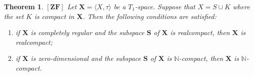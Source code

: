 \documentclass[12pt,twoside,leqno]{article}
\theoremstyle{plain}
\newtheorem{theorem}{Theorem}[section]
\theoremstyle{definition}
\theoremstyle{remark}
\begin{document}
\begin{theorem}
	\label{s6:t18}
	$[\mathbf{ZF}]$ Let $\mathbf{X}=\langle X, \tau\rangle$ be a $T_1$-space. Suppose that $X=S\cup K$ where the set $K$ is compact in $\mathbf{X}$. Then the following conditions are satisfied:
	\begin{enumerate}
		\item[(i)] if $\mathbf{X}$ is completely regular and the subspace $\mathbf{S}$ of $\mathbf{X}$ is realcompact, then $\mathbf{X}$ is realcompact;
		\item[(ii)] if $\mathbf{X}$ is zero-dimensional and the subspace $\mathbf{S}$ of $\mathbf{X}$ is $\mathbb{N}$-compact, then $\mathbf{X}$ is $\mathbb{N}$-compact. 
	\end{enumerate}
\end{theorem}
\end{document}
